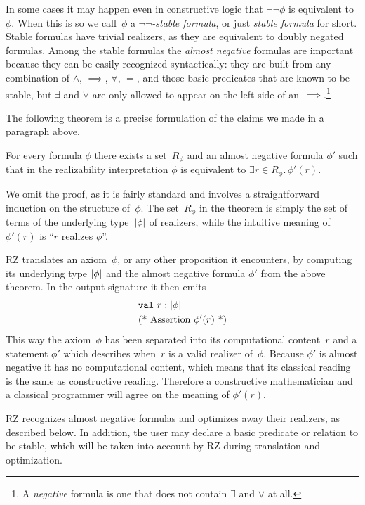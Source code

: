 In some cases it may happen even in constructive logic that
$\lnot\lnot\phi$ is equivalent to~$\phi$. When this is so we
call~$\phi$ a \emph{$\lnot\lnot$-stable formula}, or just \emph{stable
  formula} for short. Stable formulas have trivial realizers, as they
are equivalent to doubly negated formulas. Among the stable formulas
the \emph{almost negative} formulas are important because they can be
easily recognized syntactically: they are built from any combination
of $\land$, $\implies$, $\forall$, $=$, and those basic predicates
that are known to be stable, but $\exists$ and $\lor$ are only allowed
to appear on the left side of an~$\implies$.\footnote{A
  \emph{negative} formula is one that does not contain $\exists$ and
  $\lor$ at all.}

The following theorem is a precise formulation of the claims we made
in a paragraph above.

\begin{theorem}
  For every formula $\phi$ there exists a set~$R_\phi$ and an almost
  negative formula $\phi'$ such that in the realizability
  interpretation $\phi$ is equivalent to $\exists r \in R_\phi . \,
  \phi'(r)$.
\end{theorem}

We omit the proof, as it is fairly standard and involves a
straightforward induction on the structure of~$\phi$. The set~$R_\phi$
in the theorem is simply the set of terms of the underlying
type~$|\phi|$ of realizers, while the intuitive meaning of
$\phi'(r)$ is ``$r$ realizes $\phi$''.

RZ translates an axiom~$\phi$, or any other proposition it encounters,
by computing its underlying type $|\phi|$ and the almost negative
formula $\phi'$ from the above theorem. In the output signature it
then emits
%
\begin{align*}
  & \mathtt{val}\ r : |\phi| \\
  & \text{(* Assertion $\phi'(r)$ *)}
\end{align*}
%
This way the axiom~$\phi$ has been separated into its computational
content~$r$ and a statement $\phi'$ which describes when~$r$ is a
valid realizer of~$\phi$. Because $\phi'$ is almost negative it has no
computational content, which means that its classical reading is the
same as constructive reading. Therefore a constructive mathematician
and a classical programmer will agree on the meaning of $\phi'(r)$.

RZ recognizes almost negative formulas and optimizes away their
realizers, as described below. In addition, the user
may declare a basic predicate or relation to be stable, which will be
taken into account by RZ during translation and optimization.

